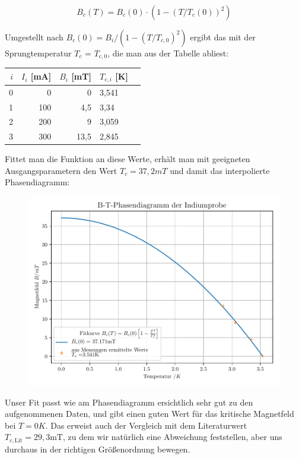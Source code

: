 \begin{equation}
B_c(T) = B_c(0) \cdot \left( 1 - \left( T / T_c(0) \right)^2 \right)
\end{equation}

Umgestellt nach $B_c(0) = B_i / (1 - (T / T_{c,0})^2 )$ ergibt das mit der Sprungtemperatur $T_c$ = $T_{c,0}$, die man aus der Tabelle abliest:

\begin{table}[h]
\center\begin{tabular}[h]{|r|r|r|l|l|}
\hline
$i$ & $I_i$ [mA] &  $B_i$ [mT] & $T_{c,i}$ [K] \\
\hline
0 &   0 &       0 & 3,541 \\
1 & 100 &  4,5 & 3,34 \\
2 & 200 &  9 & 3,059 \\
3 & 300 & 13,5 & 2,845 \\
\hline
\end{tabular}
\end{table}

Fittet man die Funktion an diese Werte, erhält man mit geeigneten Ausgangsparametern den Wert $T_c = 37,2 mT$ und damit das interpolierte Phasendiagramm:

\begin{figure}[h]
\includegraphics[width=\textwidth]{B-T-Phasendiagramm_der_Indiumprobe.pdf}
\end{figure}

Unser Fit passt wie am Phasendiagramm ersichtlich sehr gut zu den aufgenommenen Daten, und gibt einen guten Wert für das kritische Magnetfeld bei $T=0K$.
Das erweist auch der Vergleich mit dem Literaturwert $ T_{c,\textrm{Lit}} = 29,3\textrm{mT}$, zu dem wir natürlich eine Abweichung feststellen, aber uns durchaus in der richtigen Größenordnung bewegen. 

